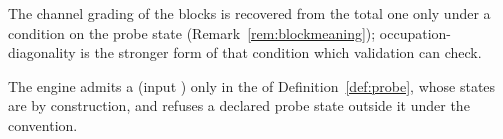 
The channel grading of the blocks is recovered from the total one only under
a condition on the probe state (Remark~\ref{rem:blockmeaning});
occupation-diagonality is the stronger form of that condition which
validation can check.

\begin{requirement}\label{req:probe-diagonal-admission}
The engine admits a  (input )
only in the  of Definition~\ref{def:probe}, whose states
are  by construction, and refuses a declared probe
state outside it under the  convention.
\end{requirement}
